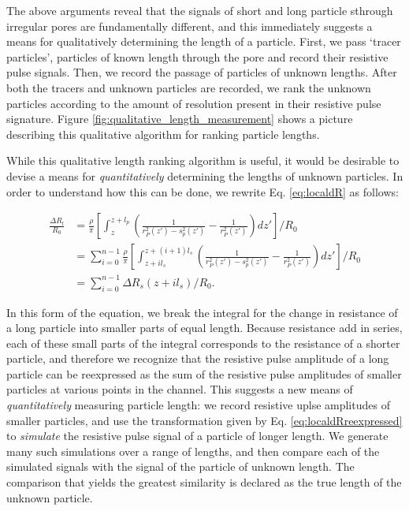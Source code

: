 			The above arguments reveal that the signals of short and long particle sthrough irregular pores are fundamentally different, and this immediately suggests a means for qualitatively determining the length of a particle. First, we pass `tracer particles', particles of known length through the pore and record their resistive pulse signals. Then, we record the passage of particles of unknown lengths. After both the tracers and unknown particles are recorded, we rank the unknown particles according to the amount of resolution present in their resistive pulse signature. Figure \ref{fig:qualitative_length_measurement} shows a picture describing this qualitative algorithm for ranking particle lengths.
			
			While this qualitative length ranking algorithm is useful, it would be desirable to devise a means for \textit{quantitatively} determining the lengths of unknown particles. In order to understand how this can be done, we rewrite Eq. \ref{eq:localdR} as follows:
			
			\begin{equation} \label{eq:localdRreexpressed}
				\begin{split}
					\frac{\Delta R_{l}}{R_{0}} &= \frac{\rho}{\pi}\left[\int_{z}^{z+l_{p}}\left(\frac{1}{r^{2}_{P}\left(z'\right)-s^{2}_{p}\left(z'\right)}-\frac{1}{r^{2}_{P}\left(z'\right)}\right)dz'\right]/R_{0} \\
					&= \sum_{i=0}^{n-1}\frac{\rho}{\pi}\left[\int_{z+il_{s}}^{z+\left(i+1\right)l_{s}}\left(\frac{1}{r^{2}_{P}\left(z'\right)-s^{2}_{p}\left(z'\right)}-\frac{1}{r^{2}_{P}\left(z'\right)}\right)dz'\right]/R_{0} \\
					&= \sum_{i=0}^{n-1}\Delta R_{s}\left(z+il_{s}\right)/R_{0}.
				\end{split}
			\end{equation}
			
			In this form of the equation, we break the integral for the change in resistance of a long particle into smaller parts of equal length. Because resistance add in series, each of these small parts of the integral corresponds to the resistance of a shorter particle, and therefore we recognize that the resistive pulse amplitude of a long particle can be reexpressed as the sum of the resistive pulse amplitudes of smaller particles at various points in the channel. This suggests a new means of \textit{quantitatively} measuring particle length: we record resistive uplse amplitudes of smaller particles, and use the transformation given by Eq. \ref{eq:localdRreexpressed} to \textit{simulate} the resistive pulse signal of a particle of longer length. We generate many such simulations over a range of lengths, and then compare each of the simulated signals with the signal of the particle of unknown length. The comparison that yields the greatest similarity is declared as the true length of the unknown particle.
			
